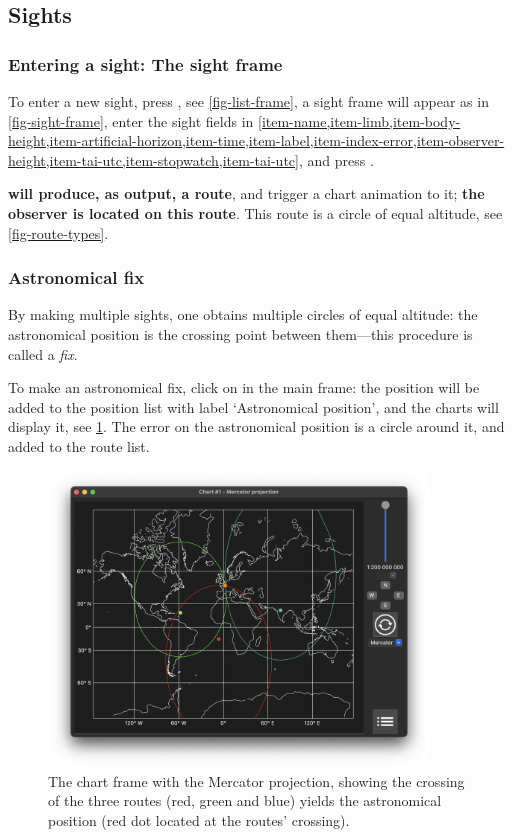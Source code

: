 \documentclass{ol-softwaremanual}
\begin{document}
\subsection{Sights}

\subsubsection{Entering a sight: The sight frame}


To enter a new sight, press  , see \cref{fig-list-frame}, a sight frame will appear as in \cref{fig-sight-frame}, enter the sight fields in  \cref{item-name,item-limb,item-body-height,item-artificial-horizon,item-time,item-label,item-index-error,item-observer-height,item-tai-utc,item-stopwatch,item-tai-utc}, and press . 

\textbf{\thel will produce, as output, a route}, and trigger a chart animation to it; \textbf{the observer is located  on this route}. This route is a circle of equal altitude, see \cref{fig-route-types}. 

\subsubsection{Astronomical fix}

By making multiple sights, one obtains multiple circles of equal altitude: the astronomical position is the crossing point between them---this procedure is called a \textit{fix}. 

To make an astronomical fix, click on  in the main frame: the position will be added to the position list with label `Astronomical position', and the charts will display it, see \cref{fig-astronomical-position}. The error on the astronomical position is a circle around it, and added to the route list. 

\begin{figure}
  \centering
  \includegraphics[width=0.9\textwidth]{figures/astronomical-position-mercator.png}
  \caption{
    \label{fig-astronomical-position}
    The chart frame with the Mercator projection, showing the crossing of the three routes (red, green and blue) yields the astronomical position (red dot located at the routes' crossing).  
  }
\end{figure}
\end{document}
